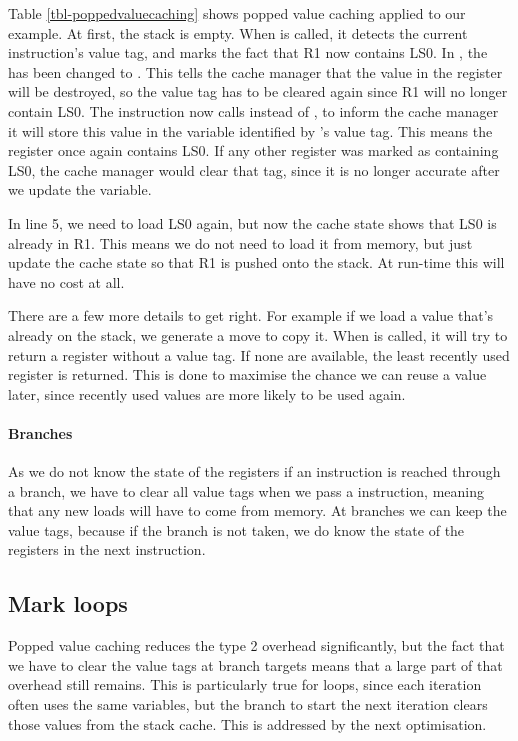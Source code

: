 Table \ref{tbl-poppedvaluecaching} shows popped value caching applied to our example. At first, the stack is empty. When  is called, it detects the current instruction's value tag, and marks the fact that R1 now contains LS0. In , the  has been changed to . This tells the cache manager that the value in the register will be destroyed, so the value tag has to be cleared again since R1 will no longer contain LS0. The  instruction now calls  instead of  , to inform the cache manager it will store this value in the variable identified by 's value tag. This means the register once again contains LS0. If any other register was marked as containing LS0, the cache manager would clear that tag, since it is no longer accurate after we update the variable.

In line 5, we need to load LS0 again, but now the cache state shows that LS0 is already in R1. This means we do not need to load it from memory, but just update the cache state so that R1 is pushed onto the stack. At run-time this  will have no cost at all.

There are a few more details to get right. For example if we load a value that's already on the stack, we generate a move to copy it. When  is called, it will try to return a register without a value tag. If none are available, the least recently used register is returned. This is done to maximise the chance we can reuse a value later, since recently used values are more likely to be used again.

\paragraph{Branches} As we do not know the state of the registers if an instruction is reached through a branch, we have to clear all value tags when we pass a  instruction, meaning that any new loads will have to come from memory. At branches we can keep the value tags, because if the branch is not taken, we do know the state of the registers in the next instruction.

\subsection{Mark loops}
\label{sec-optimisation-markloops}

Popped value caching reduces the type 2 overhead significantly, but the fact that we have to clear the value tags at branch targets means that a large part of that overhead still remains. This is particularly true for loops, since each iteration often uses the same variables, but the branch to start the next iteration clears those values from the stack cache. This is addressed by the next optimisation.

